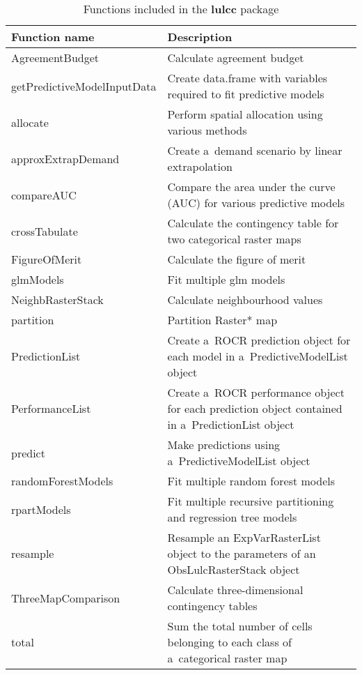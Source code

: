 \documentclass{icldt}\usepackage[]{graphicx}\usepackage[]{color}
\begin{document}
\begin{table*}[t]
\caption{Functions included in the \textbf{lulcc} package}
\begin{tabular}{ p{3.5cm} p{8.5cm} }
\hline
Function name & Description \\
\hline
AgreementBudget    & Calculate agreement budget \citep{pontius2011} \\
getPredictiveModelInputData & Create data.frame with variables required to fit predictive models \\
allocate           & Perform spatial allocation using various methods \\
approxExtrapDemand & Create a~demand scenario by linear extrapolation \\
compareAUC         & Compare the area under the curve (AUC) for various predictive models \\
crossTabulate      & Calculate the contingency table for two categorical raster maps \\
FigureOfMerit      & Calculate the figure of merit \citep{pontius2011} \\
glmModels          & Fit multiple glm models \\
NeighbRasterStack  & Calculate neighbourhood values \\
partition          & Partition Raster* map \\
PredictionList     & Create a~ROCR prediction object for each model in a~PredictiveModelList object \\
PerformanceList    & Create a~ROCR performance object for each prediction object contained in a~PredictionList object \\
predict            & Make predictions using a~PredictiveModelList object \\
randomForestModels & Fit multiple random forest models \\
rpartModels        & Fit multiple recursive partitioning and regression tree models \\
resample           & Resample an ExpVarRasterList object to the parameters of an ObsLulcRasterStack object \\
ThreeMapComparison & Calculate three-dimensional contingency tables \citep{pontius2011} \\
total              & Sum the total number of cells belonging to each class of a~categorical raster map \\
\hline
\end{tabular}
\label{table:functions}
\end{table*}
\end{document}
